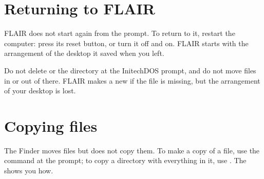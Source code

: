 \section{Returning to FLAIR}
FLAIR does not start again from the prompt.  To return to it, restart the
computer: press its reset button, or turn it off and on.  FLAIR starts with
the arrangement of the desktop it saved when you left.

\begin{MacWarning}
Do not delete  or the  directory at the
InitechDOS prompt, and do not move files in or out of  there.
FLAIR makes a new  if the file is missing, but the
arrangement of your desktop is lost.
\end{MacWarning}

\section{Copying files}
The Finder moves files but does not copy them.  To make a copy of a file,
use the  command at the prompt; to copy a directory with
everything in it, use .  The 
shows you how.
